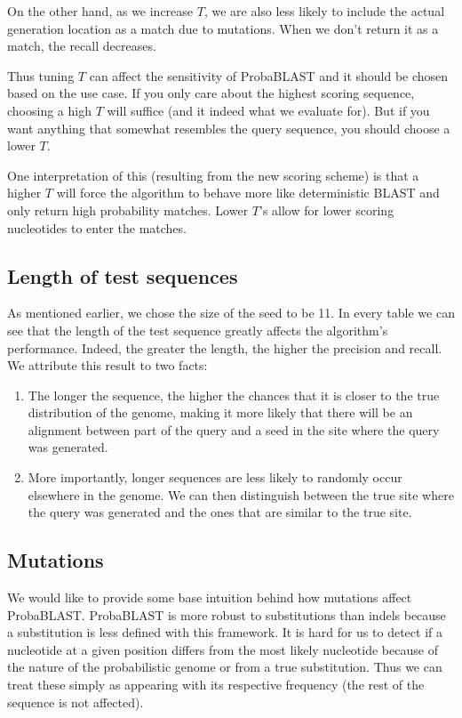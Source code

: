 \documentclass[11pt]{IEEEtran}
\begin{document}
On the other hand, as we increase $T$, we are also less likely to include the actual generation location as a match due to mutations. When we don't return it as a match, the recall decreases. 

Thus tuning $T$ can affect the sensitivity of ProbaBLAST and it should be chosen based on the use case. If you only care about the highest scoring sequence, choosing a high $T$ will suffice (and it indeed what we evaluate for). But if you want anything that somewhat resembles the query sequence, you should choose a lower $T$. 

One interpretation of this (resulting from the new scoring scheme) is that a higher $T$ will force the algorithm to behave more like deterministic BLAST and only return high probability matches. Lower $T$'s allow for lower scoring nucleotides to enter the matches.

\subsection{Length of test sequences}
As mentioned earlier, we chose the size of the seed to be 11. In every table we can see that the length of the test sequence greatly affects the algorithm's performance. Indeed, the greater the length, the higher the precision and recall. We attribute this result to two facts:
\begin{enumerate}
\item The longer the sequence, the higher the chances that it is closer to the true distribution of the genome, making it more likely that there will be an alignment between part of the query and a seed in the site where the query was generated.
\item More importantly, longer sequences are less likely to randomly occur elsewhere in the genome. We can then distinguish between the true site where the query was generated and the ones that are similar to the true site.
\end{enumerate}


\subsection{Mutations}
We would like to provide some base intuition behind how mutations affect ProbaBLAST. 
ProbaBLAST is more robust to substitutions than indels because a substitution is less defined with this framework. It is hard for us to detect if a nucleotide at a given position differs from the most likely nucleotide because of the nature of the probabilistic genome or from a true substitution. Thus we can treat these simply as appearing with its respective frequency (the rest of the sequence is not affected). 
\end{document}
